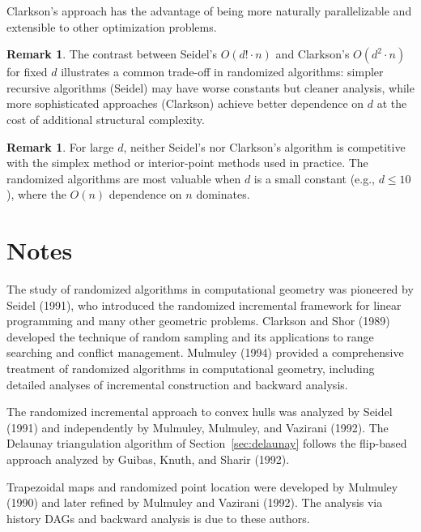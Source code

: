 \documentclass[twoside,12pt]{book}
\theoremstyle{plain}
\theoremstyle{definition}
\newtheorem{remark}[theorem]{Remark}
\theoremstyle{remark}
\begin{document}
Clarkson's approach has the advantage of being more naturally parallelizable and extensible to other optimization problems.

\begin{remark}
The contrast between Seidel's $O(d! \cdot n)$ and Clarkson's $O(d^2 \cdot n)$ for fixed $d$ illustrates a common trade-off in randomized algorithms: simpler recursive algorithms (Seidel) may have worse constants but cleaner analysis, while more sophisticated approaches (Clarkson) achieve better dependence on $d$ at the cost of additional structural complexity.
\end{remark}

\begin{remark}
For large $d$, neither Seidel's nor Clarkson's algorithm is competitive with the simplex method or interior-point methods used in practice. The randomized algorithms are most valuable when $d$ is a small constant (e.g., $d \leq 10$), where the $O(n)$ dependence on $n$ dominates.
\end{remark}

\section*{Notes}
\label{sec:notes-9}

The study of randomized algorithms in computational geometry was pioneered by Seidel (1991), who introduced the randomized incremental framework for linear programming and many other geometric problems. Clarkson and Shor (1989) developed the technique of random sampling and its applications to range searching and conflict management. Mulmuley (1994) provided a comprehensive treatment of randomized algorithms in computational geometry, including detailed analyses of incremental construction and backward analysis.

The randomized incremental approach to convex hulls was analyzed by Seidel (1991) and independently by Mulmuley, Mulmuley, and Vazirani (1992). The Delaunay triangulation algorithm of Section~\ref{sec:delaunay} follows the flip-based approach analyzed by Guibas, Knuth, and Sharir (1992).

Trapezoidal maps and randomized point location were developed by Mulmuley (1990) and later refined by Mulmuley and Vazirani (1992). The analysis via history DAGs and backward analysis is due to these authors.
\end{document}
